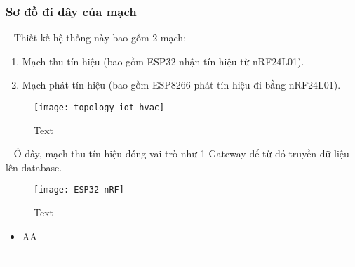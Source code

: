 \subsubsection{Sơ đồ đi dây của mạch}
-- Thiết kế hệ thống này bao gồm 2 mạch:
\begin{enumerate}
	\item Mạch thu tín hiệu (bao gồm ESP32 nhận tín hiệu từ nRF24L01).
	\item Mạch phát tín hiệu (bao gồm ESP8266 phát tín hiệu đi bằng nRF24L01).
\end{enumerate}
\begin{figure}[H]
	\centering
	\texttt{[image: topology\_iot\_hvac]}
	\caption{Text}
\end{figure}

-- Ở đây, mạch thu tín hiệu đóng vai trò như 1 Gateway để từ đó truyền dữ liệu lên database.
\begin{figure}[H]
	\centering
	\texttt{[image: ESP32-nRF]}
	\caption{Text}
\end{figure}
\begin{itemize}
	\item AA
\end{itemize}
-- 






